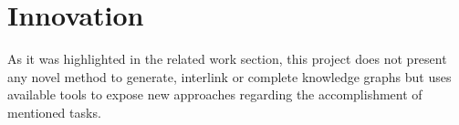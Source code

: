 \section{Innovation}
As it was highlighted in the related work section, this project does not present any novel method to generate, interlink or complete knowledge graphs but uses available tools to expose new approaches regarding the accomplishment of mentioned tasks.